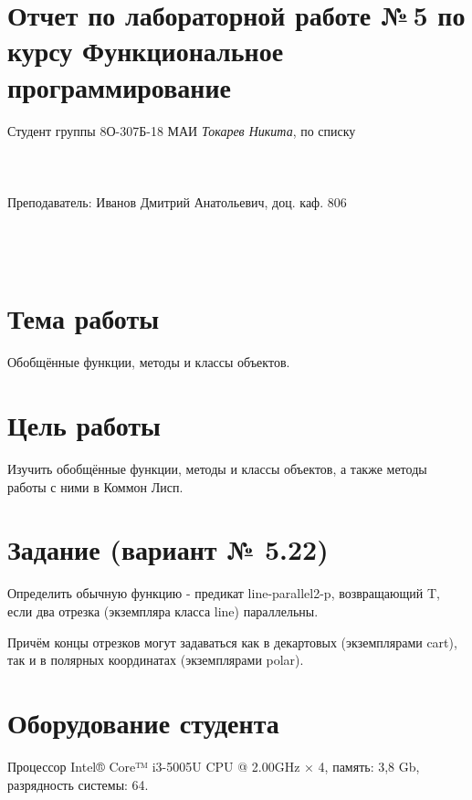 \documentclass[12pt]{article}
\begin{document}
\section*{Отчет по лабораторной работе №\,5 
по курсу \guillemotleft  Функциональное программирование\guillemotright}
\begin{flushright}
Студент группы 8О-307Б-18 МАИ \textit{Токарев Никита},  по списку \\
 \\
 \\
\ \\
Преподаватель: Иванов Дмитрий Анатольевич, доц. каф. 806 \\
 \\
 \\
 \\

\end{flushright}

\section{Тема работы}
Обобщённые функции, методы и классы объектов.

\section{Цель работы}
Изучить  обобщённые функции, методы и классы объектов, а также методы работы с ними в Коммон Лисп.

\section{Задание (вариант № 5.22)}
Определить обычную функцию - предикат line-parallel2-p,
возвращающий T, если два отрезка (экземпляра класса line) параллельны.

Причём концы отрезков могут задаваться как в декартовых (экземплярами cart), так и в полярных координатах (экземплярами polar).


\section{Оборудование студента}
Процессор Intel® Core™ i3-5005U CPU @ 2.00GHz × 4, память: 3,8 Gb, разрядность системы: 64.
\end{document}
